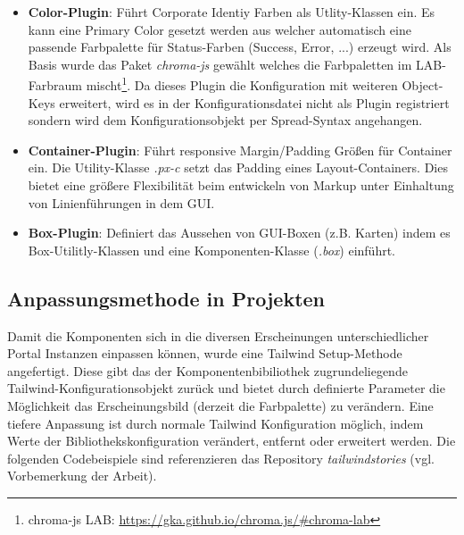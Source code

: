 \begin{itemize}
  \item \textbf{Color-Plugin}: Führt Corporate Identiy Farben als Utlity-Klassen ein. Es kann eine Primary Color gesetzt werden aus welcher automatisch eine passende Farbpalette für Status-Farben (Success, Error, ...) erzeugt wird. Als Basis wurde das Paket \textit{chroma-js} gewählt welches die Farbpaletten im LAB-Farbraum mischt\footnote{chroma-js LAB: \url{https://gka.github.io/chroma.js/\#chroma-lab}}. Da dieses Plugin die Konfiguration mit weiteren Object-Keys erweitert, wird es in der Konfigurationsdatei nicht als Plugin registriert sondern wird dem Konfigurationsobjekt per Spread-Syntax angehangen.
  \item \textbf{Container-Plugin}: Führt responsive Margin/Padding Größen für Container ein. Die Utility-Klasse \textit{.px-c} setzt das Padding eines Layout-Containers. Dies bietet eine größere Flexibilität beim entwickeln von Markup unter Einhaltung von Linienführungen in dem GUI.
  \item \textbf{Box-Plugin}: Definiert das Aussehen von GUI-Boxen (z.B. Karten) indem es Box-Utilitly-Klassen und eine Komponenten-Klasse (\textit{.box}) einführt.
\end{itemize}

\subsection{Anpassungsmethode in Projekten}
\label{sec:ProjectCustomisation}

Damit die Komponenten sich in die diversen Erscheinungen unterschiedlicher Portal Instanzen einpassen können, wurde eine Tailwind Setup-Methode angefertigt. Diese gibt das der Komponentenbibiliothek zugrundeliegende Tailwind-Konfigurationsobjekt zurück und bietet durch definierte Parameter die Möglichkeit das Erscheinungsbild (derzeit die Farbpalette) zu verändern. Eine tiefere Anpassung ist durch normale Tailwind Konfiguration möglich, indem Werte der Bibliothekskonfiguration verändert, entfernt oder erweitert werden. Die folgenden Codebeispiele sind referenzieren das Repository \textit{tailwindstories} (vgl. Vorbemerkung der Arbeit).





